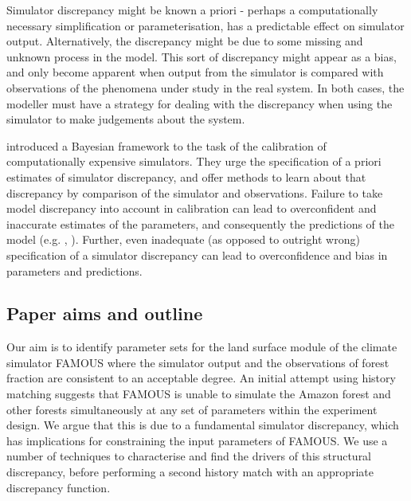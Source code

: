 \documentclass[esd, manuscript]{copernicus}
\begin{document}
Simulator discrepancy might be known a priori - perhaps a computationally necessary simplification or parameterisation, has a predictable effect on simulator output. Alternatively, the discrepancy might be due to some missing and unknown process in the model. This sort of discrepancy might appear as a bias, and only become apparent when output from the simulator is compared with observations of the phenomena under study in the real system. In both cases, the modeller must have a strategy for dealing with the discrepancy when using the simulator to make judgements about the system.

\citep{kennedy2001bayesian} introduced a Bayesian framework to the task of the calibration of computationally expensive simulators. They urge the specification of a priori estimates of simulator discrepancy, and offer methods to learn about that discrepancy by comparison of the simulator and observations. Failure to take model discrepancy into account in calibration can lead to overconfident and inaccurate estimates of the parameters, and consequently the predictions of the model (e.g. \citep{brynjarsdottir2014learning}, \citep{higdon2008calibration}). Further, even inadequate (as opposed to outright wrong) specification of a simulator discrepancy can lead to overconfidence and bias in parameters and predictions.

\subsection{Paper aims and outline}

Our aim is to identify parameter sets for the land surface module of the climate simulator FAMOUS where the simulator output and the observations of forest fraction are consistent to an acceptable degree.  An initial attempt using history matching suggests that FAMOUS is unable to simulate the Amazon forest and other forests simultaneously at any set of parameters within the experiment design. We argue that this is due to a fundamental simulator discrepancy, which has implications for constraining the input parameters of FAMOUS. We use a number of techniques to characterise and find the drivers of this structural discrepancy, before performing a second history match with an appropriate discrepancy function.
\end{document}
